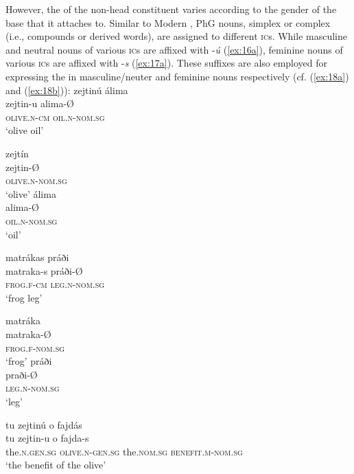 \documentclass[output=paper]{LSP/langsci}
\begin{document}
However, the  of the non-head constituent varies according to the gender of the base that it attaches to. Similar to  Modern ,  PhG nouns, simplex or complex (i.e., compounds or derived words), are assigned to different \textsc{ic}s. While masculine and neutral nouns of various \textsc{ic}s are affixed with -\textit{ú} (\ref{ex:16a}), feminine nouns of various \textsc{ic}s are affixed with -\textit{s} (\ref{ex:17a}). These suffixes are also employed for expressing the   in masculine/neuter and feminine nouns respectively (cf. (\ref{ex:18a}) and (\ref{ex:18b})):
\ea\label{ex:16}
	\ea\label{ex:16a}
		\glll	zejtinú álima \\
				zejtin-u alima-\O \\
				\textsc{olive.n-cm} \textsc{oil.n-nom.sg}\\
		\glt `olive oil'
\begin{multicols}{2}
	\ex\label{ex:16b}
		\glll	zejtín\\
				zejtin-\O \\
				\textsc{olive.n-nom.sg}\\
		\glt	`olive'
	\ex\label{ex:16c}
		\glll	álima\\
				alima-\O \\
				\textsc{oil.n-nom.sg}\\
		\glt	`oil'
\end{multicols}    
	\z
\z   
\ea\label{ex:17}
	\ea\label{ex:17a}
		\glll	matrákas práði\\
				matraka-s práði-\O \\
				\textsc{frog.f-cm} \textsc{leg.n-nom.sg}\\
		\glt	`frog leg'
\begin{multicols}{2}
	\ex\label{ex:17b}
		 \glll	matráka\\
		 		matraka-\O \\
		 		\textsc{frog.f-nom.sg}\\
		 \glt	`frog'
	\ex\label{ex:17c}
		\glll	práði\\
				praði-\O\\
				\textsc{leg.n-nom.sg}\\
		\glt	`leg'
\end{multicols}
	\z
\z
\ea\label{ex:18}
	\ea\label{ex:18a}
		\glll tu  zejtinú  o fajdás\\
				tu zejtin-u o fajda-s\\
				the.\textsc{n.gen.sg} \textsc{olive.n-gen.sg} the\textsc{.nom.sg} \textsc{benefit.m-nom.sg}\\
		\glt `the benefit of the olive'
\end{document}
